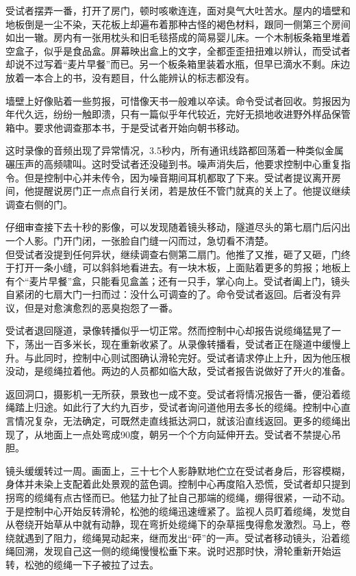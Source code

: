 \begin{scpbox}
受试者摆弄一番，打开了房门，顿时咳嗽连连，面对臭气大吐苦水。屋内的墙壁和地板倒是一尘不染，天花板上却遍布着那种古怪的褐色材料，跟同一侧第三个房间如出一辙。房内有一张用枕头和旧毛毯搭成的简易婴儿床。一个木制板条箱里堆着空盒子，似乎是食品盒。屏幕映出盒上的文字，全都歪歪扭扭难以辨认，而受试者却说不过写着“麦片早餐”而已。另一个板条箱里装着水瓶，但早已滴水不剩。床边放着一本合上的书，没有题目，什么能辨认的标志都没有。

墙壁上好像贴着一些剪报，可惜像天书一般难以卒读。命令受试者回收。剪报因为年代久远，纷纷一触即溃，只有一篇似乎年代较近，完好无损地收进野外样品保管箱中。要求他调查那本书，于是受试者开始向朝书移动。

这时录像的音频出现了异常情况，3.5秒内，所有通讯线路都回荡着一种类似金属碾压声的高频啸叫。这时受试者还没碰到书。噪声消失后，他要求控制中心重复指令。但是控制中心并未传令，因为噪音期间耳机都取了下来。受试者提议离开房间，他提醒说房门正一点点自行关闭，若是放任不管门就真的关上了。他提议继续调查右侧的门。

仔细审查接下去十秒的影像，可以发现随着镜头移动，隧道尽头的第七扇门后闪出一个人影。门开门闭，一张脸自门缝一闪而过，急切看不清楚。\\
但受试者没提到任何异状，继续调查右侧第二扇门。他推了又推，砸了又砸，门终于打开一条小缝，可以斜斜地看进去。有一块木板，上面贴着更多的剪报；地板上有个“麦片早餐”盒，只能看见盒盖；还有一只手，掌心向上。受试者阖上门，镜头自紧闭的七扇大门一扫而过：没什么可调查的了。命令受试者返回。后者没有异议，但是对愈演愈烈的恶臭抱怨了一番。

受试者退回隧道，录像转播似乎一切正常。然而控制中心却报告说缆绳猛晃了一下，荡出一百多米长，现在重新收紧了。从录像转播看，受试者正在隧道中缓慢上升。与此同时，控制中心则试图确认滑轮完好。受试者请求停止上升，因为他压根没动，是缆绳拉着他。两边的人员都如临大敌，受试者报告说做好了开火的准备。

返回洞口，摄影机一无所获，景致也一成不变。受试者将情况报告一番，便沿着缆绳踏上归途。如此行了大约九百步，受试者询问道他用去多长的缆绳。控制中心直言情况复杂，无法确定，可既然走直线抵达洞口，就该沿直线返回。更多的缆绳出现了，从地面上一点处弯成90度，朝另一个个方向延伸开去。受试者不禁提心吊胆。

镜头缓缓转过一周。画面上，三十七个人影静默地伫立在受试者身后，形容模糊，身体并未染上支配着此处景观的蓝色调。控制中心再度陷入恐慌，受试者却只提到拐弯的缆绳有点古怪而已。他猛力扯了扯自己那端的缆绳，绷得很紧，一动不动。于是控制中心开始反转滑轮，松弛的缆绳迅速缠紧了。监视人员盯着缆绳，发觉自从卷绕开始草从中就有动静，现在弯折处缆绳下的杂草摇曳得愈发激烈。马上，卷绕就遇到了阻力，缆绳晃动起来，继而发出“砰”的一声。受试者移动镜头，沿着缆绳回溯，发现自己这一侧的缆绳慢慢松垂下来。说时迟那时快，滑轮重新开始运转，松弛的缆绳一下子被拉了过去。


\end{scpbox}
